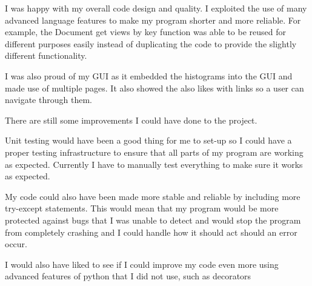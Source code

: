 \documentclass[12pt]{report}
\begin{document}
I was happy with my overall code design and quality.  I exploited the use of many advanced language features to make my program shorter and more reliable.  For example, the Document get views by key function was able to be reused for different purposes easily instead of duplicating the code to provide the slightly different functionality.

I was also proud of my GUI as it embedded the histograms into the GUI and made use of multiple pages.  It also showed the also likes with links so a user can navigate through them.

There are still some improvements I could have done to the project.

Unit testing would have been a good thing for me to set-up so I could have a proper testing infrastructure to ensure that all parts of my program are working as expected.  Currently I have to manually test everything to make sure it works as expected.

My code could also have been made more stable and reliable by including more try-except statements.  This would mean that my program would be more protected against bugs that I was unable to detect and would stop the program from completely crashing and I could handle how it should act should an error occur.

I would also have liked to see if I could improve my code even more using advanced features of python that I did not use, such as decorators



\end{document}

